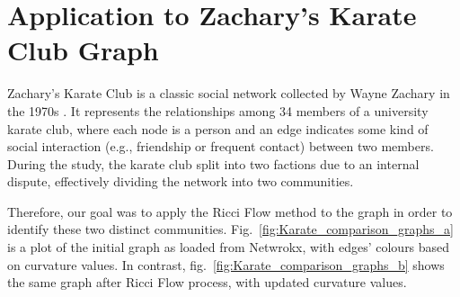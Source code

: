 \section{Application to Zachary's Karate Club Graph}
\label{sec5.3}

Zachary’s Karate Club is a classic social network collected by Wayne Zachary in the 1970s \cite{ZacharyKarateClubGraph}. It represents the relationships among 34 members of a university karate club, where each node is a person and an edge indicates some kind of social interaction (e.g., friendship or frequent contact) between two members. During the study, the karate club split into two factions due to an internal dispute, effectively dividing the network into two communities.

Therefore, our goal was to apply the Ricci Flow method to the graph in order to identify these two distinct communities.
Fig.~\ref{fig:Karate_comparison_graphs_a} is a plot of the initial graph as loaded from Netwrokx, with edges' colours based on curvature values. In contrast, fig.~\ref{fig:Karate_comparison_graphs_b} shows the same graph after Ricci Flow process, with updated curvature values. 
